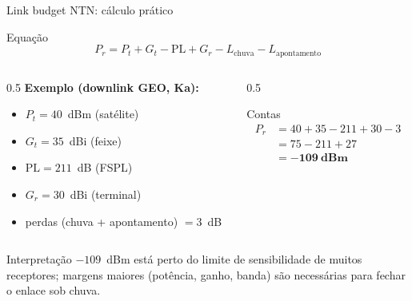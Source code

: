 \documentclass[aspectratio=169,11pt]{beamer}
\begin{document}
\begin{frame}{Link budget NTN: cálculo prático}
  \begin{block}{Equação}
    \[
      P_r = P_t + G_t - \text{PL} + G_r - L_{\text{chuva}} - L_{\text{apontamento}}
    \]
  \end{block}
  \begin{columns}
    \begin{column}{0.5\textwidth}
      \textbf{Exemplo (downlink GEO, Ka):}
      \begin{itemize}
        \item $P_t = 40$~dBm (satélite)
        \item $G_t = 35$~dBi (feixe)
        \item $\text{PL} = 211$~dB (FSPL)
        \item $G_r = 30$~dBi (terminal)
        \item perdas (chuva + apontamento) $= 3$~dB
      \end{itemize}
    \end{column}
    \begin{column}{0.5\textwidth}
      \begin{block}{Contas}
        \begin{align*}
          P_r &= 40 + 35 - 211 + 30 - 3\\
              &= 75 - 211 + 27\\
              &= \mathbf{-109\ \text{dBm}}
        \end{align*}
      \end{block}
    \end{column}
  \end{columns}
  \begin{alertblock}{Interpretação}
    $-109$~dBm está perto do limite de sensibilidade de muitos receptores; margens maiores (potência, ganho, banda) são necessárias para fechar o enlace sob chuva.
  \end{alertblock}
\end{frame}
\end{document}
